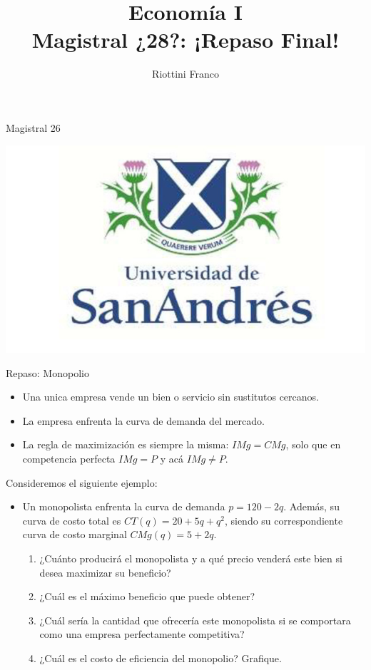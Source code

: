 \documentclass{beamer}
\title[Economía I]{Economía I \vspace{4mm}
\\ Magistral ¿28?: ¡Repaso Final!}
\date{}
\author[Riottini]{Riottini Franco}
\institute[]{Universidad de San Andrés}
\begin{document}
\begin{frame}
\titlepage
\centering
Magistral 26

\includegraphics[scale=0.2]{../Figures/logoUDESA.jpg} 
\end{frame}

\begin{frame}{Repaso: Monopolio}
    \begin{itemize}
        \item Una unica empresa vende un bien o servicio sin sustitutos cercanos.
        \item La empresa enfrenta la curva de demanda del mercado.
        \item La regla de maximización es siempre la misma: $IMg=CMg$, solo que en competencia perfecta $IMg = P$ y acá $IMg \neq P$.
    \end{itemize}
    Consideremos el siguiente ejemplo:
    \begin{itemize}
        \item Un monopolista enfrenta la curva de demanda \( p = 120 - 2q \). Además, su curva de costo total es \( CT(q) = 20 + 5q + q^2 \), siendo su correspondiente curva de costo marginal \( CMg(q) = 5 + 2q \).

        \begin{enumerate}
            \item ¿Cuánto producirá el monopolista y a qué precio venderá este bien si desea maximizar su beneficio?
            \item ¿Cuál es el máximo beneficio que puede obtener?
            \item ¿Cuál sería la cantidad que ofrecería este monopolista si se comportara como una empresa perfectamente competitiva?
            \item ¿Cuál es el costo de eficiencia del monopolio? Grafique.
        \end{enumerate}
    \end{itemize}
\end{frame}
\end{document}
